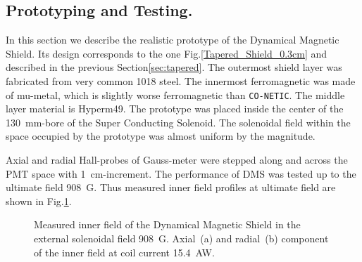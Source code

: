 \documentclass[12pt]{article}
\begin{document}
\subsection{Prototyping and Testing.}
\label{sec:tests}
In this section  we describe the  realistic   prototype of the Dynamical Magnetic Shield.
Its  design corresponds to the one Fig.\ref{Tapered_Shield_0.3cm} and
 described in the previous Section\ref{sec:tapered}.
The outermost shield layer was fabricated from very common 1018 steel. The innermost 
ferromagnetic was made of mu-metal, which is slightly worse ferromagnetic than  {\tt CO-NETIC}.
The middle layer material is Hyperm49. 
The prototype was placed inside the center of the 130~mm-bore 
of  the Super Conducting Solenoid.
 The solenoidal  field within the space occupied by the prototype was almost
 uniform by the  magnitude.

Axial and radial Hall-probes of Gauss-meter were stepped  along and across 
the PMT space  with  1~cm-increment. The performance of DMS was tested  up to the  ultimate  
field 908~G. 
Thus measured  inner field profiles at ultimate field are shown in Fig.\ref{innergauss}.
%
\begin{figure}[ht]%
\centering
{}
\qquad
{}
\caption{\small{Measured inner field of the Dynamical  Magnetic Shield
in  the external  solenoidal field 908~G.
 Axial~(a) and radial~(b) component of the inner field at coil current 15.4~AW.}
\label{innergauss}}
\end{figure}
\end{document}
